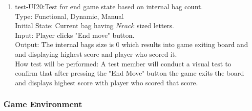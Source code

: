 \documentclass[12pt, titlepage]{article}
\begin{document}
\begin{enumerate}
    \item{test-UI20:Test for end game state based on internal bag count.\\} %
    Type: Functional, Dynamic, Manual\\
    Initial State: Current bag having $N rack$ sized letters.\\
    Input: Player clicks "End move" button. \\
    Output: The internal bags size is 0 which results into game exiting board and and displaying highest score and player who scored it. \\
    How test will be performed: A test member will conduct a visual test to confirm that after pressing the "End Move" button the game exits the board and displays highest score with player who scored that score.\\
    
\end{enumerate}
\subsubsection{Game Environment}
\end{document}
